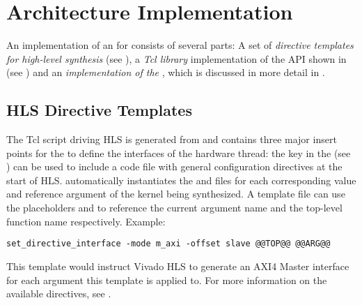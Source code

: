 \section{Architecture Implementation}\label{sec:architecture-implementation}%
An implementation of an  for \tpc{} consists of several parts:
A set of \emph{directive templates for high-level synthesis} (see ), a \emph{Tcl library} implementation of the API shown in  (see ) and an \emph{implementation of the }, which is discussed in more detail in .
%
\subsection{HLS Directive Templates}\label{sec:ai-hls}%
The Tcl script driving HLS is generated from  and contains three major insert points for the  to define the interfaces of the hardware thread:
the key  in the  (see ) can be used to include a code file with general configuration directives at the start of HLS.
\tpc{} automatically instantiates the  and  files for each corresponding value and reference argument of the kernel being synthesized.
A template file can use the placeholders  and  to reference the current argument name and the top-level function name respectively.
Example:
%
\begin{lstlisting}[language={[TemplateTcl]Tcl}]
set_directive_interface -mode m_axi -offset slave @@TOP@@ @@ARG@@
\end{lstlisting}
%
This template would instruct Vivado HLS to generate an AXI4 Master interface for each argument this template is applied to.
For more information on the available directives, see \cite{ug902}.

